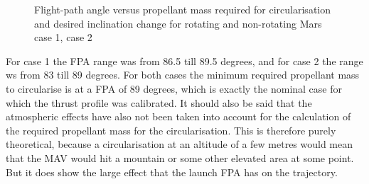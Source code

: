 \begin{figure}[H]
\centering
{} 
\caption{Flight-path angle versus propellant mass required for circularisation and desired inclination change for rotating and non-rotating Mars \protect{} case 1,  \protect{} case 2 } 
\label{fig:FPAvsPropellantMassCase1combined} 
\end{figure}

\noindent
For case 1 the \ac{FPA} range was from 86.5 till 89.5 degrees, and for case 2 the range ws from 83 till 89 degrees. For both cases the minimum required propellant mass to circularise is at a \ac{FPA} of 89 degrees, which is exactly the nominal case for which the thrust profile was calibrated. It should also be said that the atmospheric effects have also not been taken into account for the calculation of the required propellant mass for the circularisation. This is therefore purely theoretical, because a circularisation at an altitude of a few metres would mean that the \ac{MAV} would hit a mountain or some other elevated area at some point. But it does show the large effect that the launch \ac{FPA} has on the trajectory.


